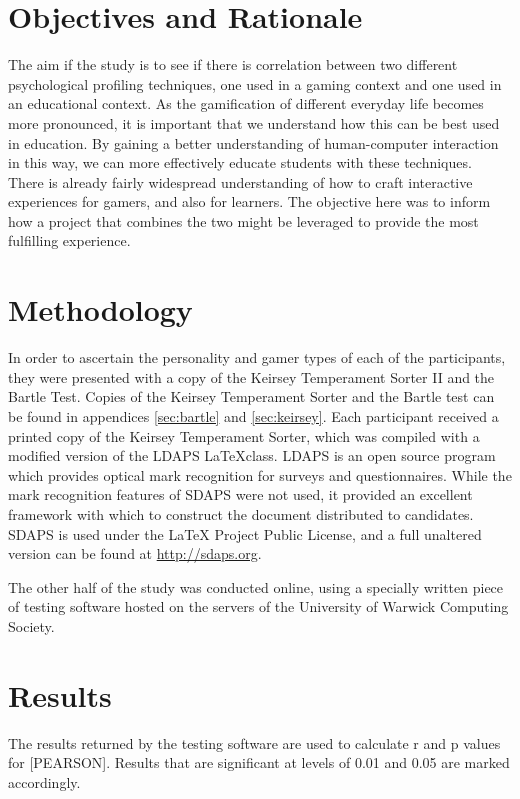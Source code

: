 \documentclass[12pt,a4paper,twoside]{report}
\begin{document}
\section{Objectives and Rationale}
The aim if the study is to see if there is correlation between two different psychological profiling techniques, one used in a gaming context and one used in an educational context. As the gamification of different everyday life becomes more pronounced, it is important that we understand how this can be best used in education. By gaining a better understanding of human-computer interaction in this way, we can more effectively educate students with these techniques. There is already fairly widespread understanding of how to craft interactive experiences for gamers, and also for learners. The objective here was to inform how a project that combines the two might be leveraged to provide the most fulfilling experience.

\section{Methodology}
In order to ascertain the personality and gamer types of each of the participants, they were presented with a copy of the Keirsey Temperament Sorter II and the Bartle Test. Copies of the Keirsey Temperament Sorter and the Bartle test can be found in appendices \ref{sec:bartle} and \ref{sec:keirsey}. Each participant received a printed copy of the Keirsey Temperament Sorter, which was compiled with a modified version of the LDAPS \LaTeX class. LDAPS is an open source program which provides optical mark recognition for surveys and questionnaires. While the mark recognition features of SDAPS were not used, it provided an excellent framework with which to construct the document distributed to candidates. SDAPS is used under the LaTeX Project Public License, and a full unaltered version can be found at \url{http://sdaps.org}.

The other half of the study was conducted online, using a specially written piece of testing software hosted on the servers of the University of Warwick Computing Society.




\section{Results}
The results returned by the testing software are used to calculate r and p values for [PEARSON]. Results that are significant at levels of 0.01 and 0.05 are marked accordingly.
\end{document}
